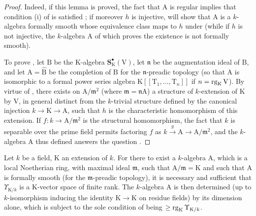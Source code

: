 \begin{proof}
Indeed, if this lemma is proved, the fact that $\mathrm{A}$ is regular implies that condition (i) of  is satisfied ; if moreover $h$ is injective,  will show that $\mathrm{A}$ is a $k$-algebra formally smooth whose equivalence class maps to $h$ under  (while if $h$ is not injective, the $k$-algebra $\mathrm{A}$ of which  proves the existence is not formally smooth).

To prove , let $\mathrm{B}$ be the $\mathrm{K}$-algebra $\mathbf{S}^\bullet_\mathrm{K}(\mathrm{V})$, let $\mathfrak{n}$ be the augmentation ideal of $\mathrm{B}$, and let $\mathrm{A}=\widehat{\mathrm{B}}$ be the completion of $\mathrm{B}$ for the $\mathfrak{n}$-preadic topology (so that $\mathrm{A}$ is isomorphic to a formal power series algebra $\mathrm{K}[[\mathrm{T}_1,\ldots,\mathrm{T}_n]]$ if $n=\operatorname{rg}_\mathrm{K}\mathrm{V}$).
By virtue of , there exists on $\mathrm{A}/\mathfrak{m}^2$ (where $\mathfrak{m}=\mathfrak{n}\mathrm{A}$) a structure of $k$-extension of $\mathrm{K}$ by $\mathrm{V}$, in general distinct from the $k$-trivial structure defined by the canonical injection $k\to\mathrm{K}\to\mathrm{A}$, such that $h$ is the characteristic homomorphism of this extension.
If $f:k\to\mathrm{A}/\mathfrak{m}^2$ is the structural homomorphism, the fact that $k$ is separable over the prime field permits  factoring $f$ as $k\xrightarrow{g}\mathrm{A}\to\mathrm{A}/\mathfrak{m}^2$, and the $k$-algebra $\mathrm{A}$ thus defined answers the question .
\end{proof}

\begin{theorem}[22.2.6]
\label{0.22.2.6}
Let $k$ be a field, $\mathrm{K}$ an extension of $k$.
For there to exist a $k$-algebra $\mathrm{A}$, which is a local Noetherian ring, with maximal ideal $\mathfrak{m}$, such that $\mathrm{A}/\mathfrak{m}=\mathrm{K}$ and such that $\mathrm{A}$ is formally smooth (for the $\mathfrak{m}$-preadic topology), it is necessary and sufficient that $\Upsilon_{\mathrm{K}/k}$ is a $\mathrm{K}$-vector space of finite rank.
The $k$-algebra $\mathrm{A}$ is then determined (up to $k$-isomorphism inducing the identity $\mathrm{K}\to\mathrm{K}$ on residue fields) by its dimension alone, which is subject to the sole condition of being $\geq\operatorname{rg}_\mathrm{K}\Upsilon_{\mathrm{K}/k}$.
\end{theorem}

